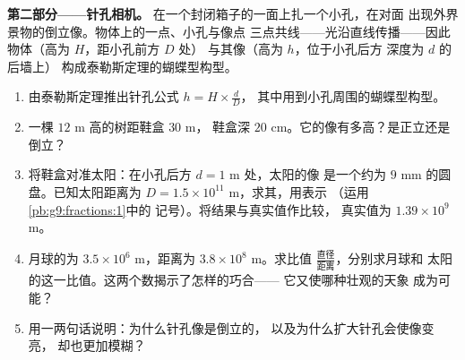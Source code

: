 \begin{problem}
\medskip
\noindent\textbf{第二部分——针孔相机。}
在一个封闭箱子的一面上扎一个小孔，在对面
出现外界景物的倒立像。物体上的一点、小孔与像点
三点共线——光沿直线传播——因此
物体（高为 $H$，距小孔前方 $D$ 处）
与其像（高为 $h$，位于小孔后方
深度为 $d$ 的后墙上）
构成泰勒斯定理的蝴蝶型构型。
\begin{enumerate}[resume]
  \item 由泰勒斯定理推出针孔公式
        $h = H \times \frac dD$，
        其中用到小孔周围的蝴蝶型构型。
  \item 一棵 $12$ m 高的树距鞋盒 $30$ m，
        鞋盒深 $20$ cm。它的像有多高？是正立还是倒立？
  \item 将鞋盒对准太阳：在小孔后方 $d = 1$ m 处，太阳的像
        是一个约为
        $9$ mm 的圆盘。已知太阳距离为
        $D = 1.5 \times 10^{11}$ m，求其，用表示
        （运用\cref{pb:g9:fractions:1}中的
        记号）。将结果与真实值作比较，
        真实值为 $1.39 \times 10^9$ m。
  \item 月球的为 $3.5 \times 10^6$ m，距离为
        $3.8 \times 10^8$ m。求比值
        $\frac{\text{直径}}{\text{距离}}$，分别求月球和
        太阳的这一比值。这两个数揭示了怎样的巧合——
        它又使哪种壮观的天象
        成为可能？
  \item 用一两句话说明：为什么针孔像是倒立的，
        以及为什么扩大针孔会使像变亮，
        却也更加模糊？
\end{enumerate}


\end{problem}
